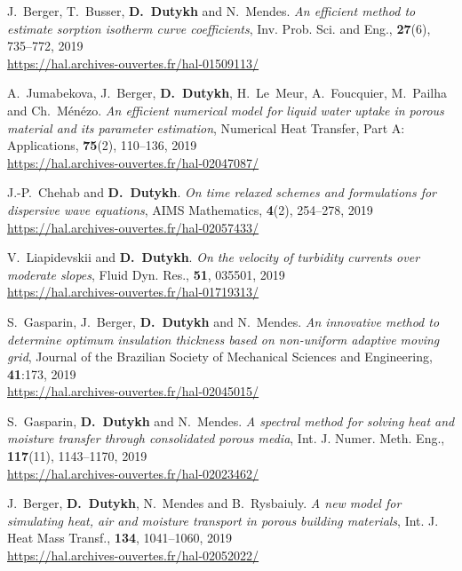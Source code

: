 \begin{etaremune}
  \item J.~Berger, T.~Busser, \textbf{D.~Dutykh} and N.~Mendes. \textit{An efficient method to estimate sorption isotherm curve coefficients},  Inv. Prob. Sci. and Eng., \textbf{27}(6), 735--772, 2019 \\ %
  \url{https://hal.archives-ouvertes.fr/hal-01509113/}
  
  \item A.~Jumabekova, J.~Berger, \textbf{D.~Dutykh}, H.~Le~Meur, A.~Foucquier, M.~Pailha and Ch.~M\'en\'ezo. \textit{An efficient numerical model for liquid water uptake in porous material and its parameter estimation}, Numerical Heat Transfer, Part A: Applications, \textbf{75}(2), 110--136, 2019 \\ %
  \url{https://hal.archives-ouvertes.fr/hal-02047087/}
  
  \item J.-P.~Chehab and \textbf{D.~Dutykh}. \textit{On time relaxed schemes and formulations for dispersive wave equations}, AIMS Mathematics, \textbf{4}(2), 254--278, 2019 \\ %
  \url{https://hal.archives-ouvertes.fr/hal-02057433/}
  
  \item V.~Liapidevskii and \textbf{D.~Dutykh}. \textit{On the velocity of turbidity currents over moderate slopes}, Fluid Dyn. Res., \textbf{51}, 035501, 2019 \\ %
  \url{https://hal.archives-ouvertes.fr/hal-01719313/}
  
  \item S.~Gasparin, J.~Berger, \textbf{D.~Dutykh} and N.~Mendes. \textit{An innovative method to determine optimum insulation thickness based on non-uniform adaptive moving grid}, Journal of the Brazilian Society of Mechanical Sciences and Engineering, \textbf{41}:173, 2019 \\ %
  \url{https://hal.archives-ouvertes.fr/hal-02045015/}
  
  \item S.~Gasparin, \textbf{D.~Dutykh} and N.~Mendes. \textit{A spectral method for solving heat and moisture transfer through consolidated porous media}, Int. J. Numer. Meth. Eng., \textbf{117}(11), 1143--1170, 2019 \\ %
  \url{https://hal.archives-ouvertes.fr/hal-02023462/}
  
  \item J.~Berger, \textbf{D.~Dutykh}, N.~Mendes and B.~Rysbaiuly. \textit{A new model for simulating heat, air and moisture transport in porous building materials}, Int. J. Heat Mass Transf., \textbf{134}, 1041--1060, 2019 \\ %
  \url{https://hal.archives-ouvertes.fr/hal-02052022/}
  

\end{etaremune}
